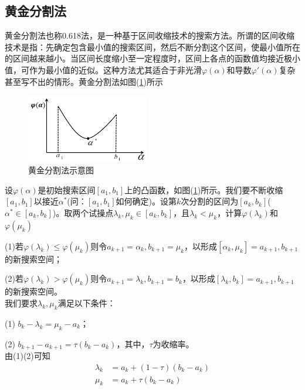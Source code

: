     \subsection{黄金分割法}
        \par
        黄金分割法也称0.618法，是一种基于区间收缩技术的搜索方法。所谓的区间收缩技术是指：先确定包含最小值的搜索区间，然后不断分割这个区间，使最小值所在的区间越来越小。当区间长度缩小至一定程度时，区间上各点的函数值均接近极小值，可作为最小值的近似。这种方法尤其适合于非光滑$\varphi(\alpha)$和导数${\varphi}{'}(\alpha)$复杂甚至写不出的情形。黄金分割法如图(\ref{fig:黄金分割法示意图})所示
        \begin{figure}[H]
        \centering
        \includegraphics[height=3cm]{images/golden.jpg}
        \caption{黄金分割法示意图}
        \label{fig:黄金分割法示意图}
        \end{figure}
        \par
        设$\varphi(\alpha)$是初始搜索区间$[a_1,b_1]$上的凸函数，如图(\ref{fig:黄金分割法示意图})所示。我们要不断收缩$[a_1,b_1]$以接近$\alpha ^*$(问：$[a_1,b_1]$如何确定)。设第$k$次分割的区间为$[a_k,b_k]$($\alpha^*\in [a_k,b_k]$)。取两个试操点$\lambda_k,\mu_k\in [a_k,b_k]$，且${\lambda}_k<{\mu}_k$，计算$\varphi({\lambda}_k)$和$\varphi({\mu}_k)$
        \par
        (1)若$\varphi({\lambda}_k) \le \varphi({\mu}_k)$则令$a_{k+1}={\alpha}_k,b_{k+1}={\mu}_k$，以形成$[{\alpha}_k,{\mu}_k]=a_{k+1},b_{k+1}$的新搜索空间；
        \par
        (2)若$\varphi({\lambda}_k) > \varphi({\mu}_k)$则令$a_{k+1}={\lambda}_k,b_{k+1}=b_k$，以形成$[{\lambda}_k,b_k]=a_{k+1},b_{k+1}$的新搜索空间。\\
        我们要求${\lambda}_k,{\mu}_k$满足以下条件：\par
        (1) $b_k-{\lambda}_k={\mu}_k-a_k$；\par
        (2) $b_{k+1}-a_{k+1}=\tau (b_k-a_k)$，其中，$\tau $为收缩率。\\
        由(1)(2)可知
        \begin{align*}
        {\lambda}_k & =a_k+(1-\tau)(b_k-a_k)\\
        {\mu}_k & =a_k+\tau(b_k-a_k)
        \end{align*}
